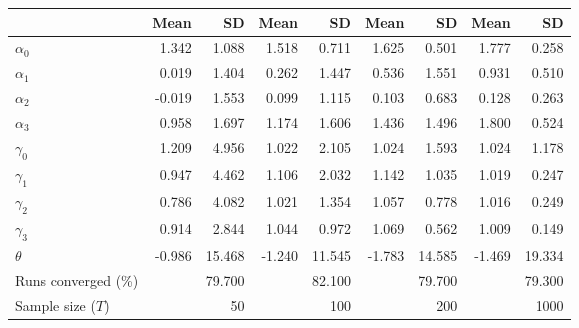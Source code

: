 
\begin{tabular}[t]{lrrrrrrrr}
\toprule
  & Mean & SD & Mean  & SD  & Mean   & SD   & Mean    & SD   \\
\midrule
$\alpha_{0}$ & 1.342 & 1.088 & 1.518 & 0.711 & 1.625 & 0.501 & 1.777 & 0.258\\
$\alpha_{1}$ & 0.019 & 1.404 & 0.262 & 1.447 & 0.536 & 1.551 & 0.931 & 0.510\\
$\alpha_{2}$ & -0.019 & 1.553 & 0.099 & 1.115 & 0.103 & 0.683 & 0.128 & 0.263\\
$\alpha_{3}$ & 0.958 & 1.697 & 1.174 & 1.606 & 1.436 & 1.496 & 1.800 & 0.524\\
$\gamma_{0}$ & 1.209 & 4.956 & 1.022 & 2.105 & 1.024 & 1.593 & 1.024 & 1.178\\
$\gamma_{1}$ & 0.947 & 4.462 & 1.106 & 2.032 & 1.142 & 1.035 & 1.019 & 0.247\\
$\gamma_{2}$ & 0.786 & 4.082 & 1.021 & 1.354 & 1.057 & 0.778 & 1.016 & 0.249\\
$\gamma_{3}$ & 0.914 & 2.844 & 1.044 & 0.972 & 1.069 & 0.562 & 1.009 & 0.149\\
$\theta$ & -0.986 & 15.468 & -1.240 & 11.545 & -1.783 & 14.585 & -1.469 & 19.334\\
Runs converged (\%) &  & 79.700 &  & 82.100 &  & 79.700 &  & 79.300\\
Sample size ($T$) &  & 50 &  & 100 &  & 200 &  & 1000\\
\bottomrule
\end{tabular}
